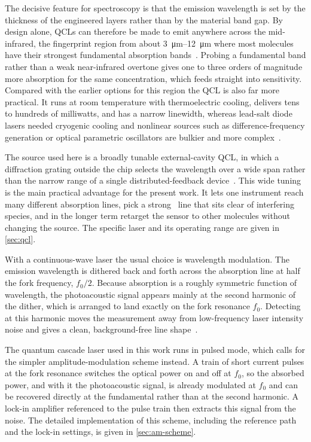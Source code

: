 The decisive feature for spectroscopy is that the emission wavelength is set by the thickness of the engineered layers rather than by the material band gap. By design alone, QCLs can therefore be made to emit anywhere across the mid-infrared, the fingerprint region from about \SIrange{3}{12}{\micro\meter} where most molecules have their strongest fundamental absorption bands~. Probing a fundamental band rather than a weak near-infrared overtone gives one to three orders of magnitude more absorption for the same concentration, which feeds straight into sensitivity. Compared with the earlier options for this region the QCL is also far more practical. It runs at room temperature with thermoelectric cooling, delivers tens to hundreds of milliwatts, and has a narrow linewidth, whereas lead-salt diode lasers needed cryogenic cooling and nonlinear sources such as difference-frequency generation or optical parametric oscillators are bulkier and more complex~.

The source used here is a broadly tunable external-cavity QCL, in which a diffraction grating outside the chip selects the wavelength over a wide span rather than the narrow range of a single distributed-feedback device~. This wide tuning is the main practical advantage for the present work. It lets one instrument reach many different absorption lines, pick a strong \nto\ line that sits clear of interfering species, and in the longer term retarget the sensor to other molecules without changing the source. The specific laser and its operating range are given in \cref{sec:qcl}.

With a continuous-wave laser the usual choice is wavelength modulation. The emission wavelength is dithered back and forth across the absorption line at half the fork frequency, $f_0/2$. Because absorption is a roughly symmetric function of wavelength, the photoacoustic signal appears mainly at the second harmonic of the dither, which is arranged to land exactly on the fork resonance $f_0$. Detecting at this harmonic moves the measurement away from low-frequency laser intensity noise and gives a clean, background-free line shape~\cite{patimisco2014}.

The quantum cascade laser used in this work runs in pulsed mode, which calls for the simpler amplitude-modulation scheme instead. A train of short current pulses at the fork resonance switches the optical power on and off at $f_0$, so the absorbed power, and with it the photoacoustic signal, is already modulated at $f_0$ and can be recovered directly at the fundamental rather than at the second harmonic. A lock-in amplifier referenced to the pulse train then extracts this signal from the noise. The detailed implementation of this scheme, including the reference path and the lock-in settings, is given in \cref{sec:am-scheme}.

